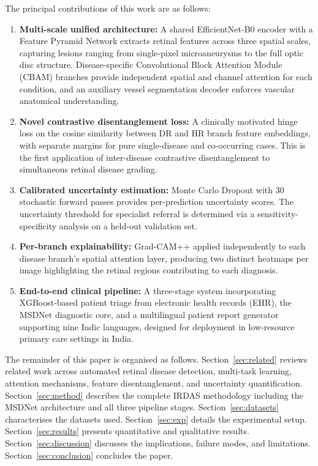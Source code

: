 \documentclass[review,12pt]{elsarticle}
\begin{document}
The principal contributions of this work are as follows:

\begin{enumerate}
  \item \textbf{Multi-scale unified architecture:} A shared EfficientNet-B0
  encoder with a Feature Pyramid Network extracts retinal features across
  three spatial scales, capturing lesions ranging from single-pixel
  microaneurysms to the full optic disc structure. Disease-specific
  Convolutional Block Attention Module (CBAM) branches provide independent
  spatial and channel attention for each condition, and an auxiliary vessel
  segmentation decoder enforces vascular anatomical understanding.

  \item \textbf{Novel contrastive disentanglement loss:} A clinically motivated
  hinge loss on the cosine similarity between DR and HR branch feature
  embeddings, with separate margins for pure single-disease and co-occurring
  cases. This is the first application of inter-disease contrastive
  disentanglement to simultaneous retinal disease grading.

  \item \textbf{Calibrated uncertainty estimation:} Monte Carlo Dropout with 30
  stochastic forward passes provides per-prediction uncertainty scores. The
  uncertainty threshold for specialist referral is determined via a
  sensitivity-specificity analysis on a held-out validation set.

  \item \textbf{Per-branch explainability:} Grad-CAM++ applied independently
  to each disease branch's spatial attention layer, producing two distinct
  heatmaps per image highlighting the retinal regions contributing to each
  diagnosis.

  \item \textbf{End-to-end clinical pipeline:} A three-stage system
  incorporating XGBoost-based patient triage from electronic health records
  (EHR), the MSDNet diagnostic core, and a multilingual patient report
  generator supporting nine Indic languages, designed for deployment in
  low-resource primary care settings in India.
\end{enumerate}

The remainder of this paper is organised as follows. Section~\ref{sec:related}
reviews related work across automated retinal disease detection, multi-task
learning, attention mechanisms, feature disentanglement, and uncertainty
quantification. Section~\ref{sec:method} describes the complete IRDAS
methodology including the MSDNet architecture and all three pipeline stages.
Section~\ref{sec:datasets} characterises the datasets used.
Section~\ref{sec:exp} details the experimental setup. Section~\ref{sec:results}
presents quantitative and qualitative results. Section~\ref{sec:discussion}
discusses the implications, failure modes, and limitations.
Section~\ref{sec:conclusion} concludes the paper.
\end{document}
